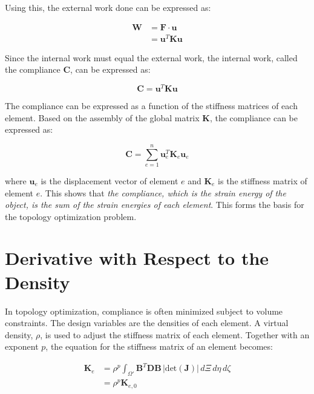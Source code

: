 Using this, the external work done can be expressed as:

\begin{align}
\label{eq:compliance2}
\mathbf{W} &= \mathbf{F} \cdot \mathbf{u} \\
           &= \mathbf{u}^T \mathbf{K} \mathbf{u}
\end{align}

Since the internal work must equal the external work, the internal work, called the compliance \(\mathbf{C}\), can be expressed as:

\begin{equation}
\label{eq:compliance3}
\mathbf{C} = \mathbf{u}^T \mathbf{K} \mathbf{u}
\end{equation}

The compliance can be expressed as a function of the stiffness matrices of each element. Based on the assembly of the global matrix \(\mathbf{K}\), the compliance can be expressed as:

\begin{equation}
\mathbf{C} = \sum_{e=1}^{n} \mathbf{u}_e^T \mathbf{K}_e \mathbf{u}_e
\end{equation}

where \(\mathbf{u}_e\) is the displacement vector of element \(e\) and \(\mathbf{K}_e\) is the stiffness matrix of element \(e\).
This shows that \textit{the compliance, which is the strain energy of the object, is the sum of the strain energies of each element}.
This forms the basis for the topology optimization problem.

\section{Derivative with Respect to the Density}

In topology optimization, compliance is often minimized subject to volume constraints. The design variables are the densities of each element. A virtual density, \(\rho\), is used to adjust the stiffness matrix of each element. Together with an exponent \(p\), the equation for the stiffness matrix of an element becomes:

\begin{align}
\label{eq:stiffness_matrix3}
\mathbf{K}_e &= \rho^p \int_{\Omega'} \mathbf{B}^T \mathbf{D} \mathbf{B} \, |\text{det}(\mathbf{J})| \, d\Xi \, d\eta \, d\zeta \\
             &= \rho^p \mathbf{K}_{e,0}
\end{align}

